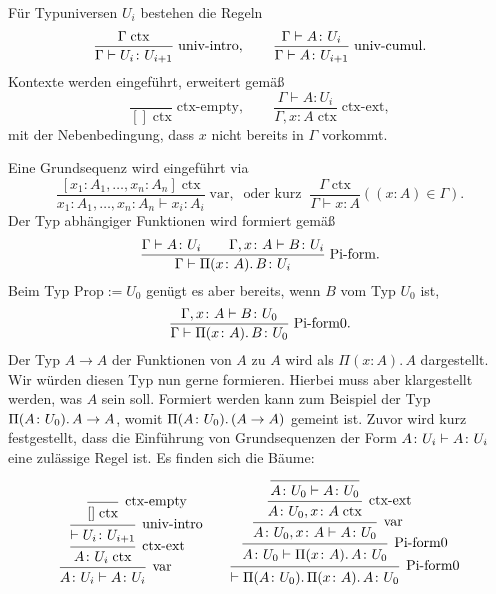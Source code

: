 Für Typuniversen $U_i$ bestehen die Regeln 
\[\dfrac{\Gamma\;\mathrm{ctx}}{\Gamma\vdash U_i\colon U_{i+1}}\;\text{univ-intro},
\qquad\dfrac{\Gamma\vdash A\colon U_i}{\Gamma\vdash A\colon U_{i+1}}\;\text{univ-cumul}.\]
Kontexte werden eingeführt, erweitert gemäß
\[\dfrac{}{[]\;\mathrm{ctx}}\;\text{ctx-empty},\qquad
\dfrac{\Gamma\vdash A\colon U_i}{\Gamma,x\colon A\;\mathrm{ctx}}\;\text{ctx-ext},\]
mit der Nebenbedingung, dass $x$ nicht bereits in $\Gamma$ vorkommt.

Eine Grundsequenz wird eingeführt via
\[\dfrac{[x_1\colon A_1, \ldots, x_n\colon A_n]\;\mathrm{ctx}}{
x_1\colon A_1, \ldots, x_n\colon A_n\vdash x_i\colon A_i}\;\mathrm{var},\;\;\text{oder kurz}\;\;
\dfrac{\Gamma\;\mathrm{ctx}}{\Gamma\vdash x\colon A}((x\colon A)\in\Gamma).\]
Der Typ abhängiger Funktionen wird formiert gemäß
\[\dfrac{\Gamma\vdash A\colon U_i\qquad\Gamma,x\colon A\vdash B\colon U_i}{
  \Gamma\vdash\Pi(x\colon A).\,B\colon U_i}\;\text{Pi-form}.\]
Beim Typ $\mathrm{Prop}:=U_0$ genügt es aber bereits, wenn $B$ vom Typ $U_0$ ist,
\[\dfrac{\Gamma,x\colon A\vdash B\colon U_0}{
  \Gamma\vdash\Pi(x\colon A).\,B\colon U_0}\;\text{Pi-form0}.\]
Der Typ $A\to A$ der Funktionen von $A$ zu $A$ wird als
$\Pi(x\colon A).\, A$ dargestellt. Wir würden diesen Typ nun gerne
formieren. Hierbei muss aber klargestellt werden, was $A$ sein soll.
Formiert werden kann zum Beispiel der Typ $\Pi(A\colon U_0).\,A\to A$,
womit $\Pi(A\colon U_0).\,(A\to A)$ gemeint ist.
Zuvor wird kurz festgestellt, dass die Einführung von Grundsequenzen der
Form $A\colon U_i\vdash A\colon U_i$ eine zulässige Regel ist.
Es finden sich die Bäume:
\[
\begin{array}{l@{\qquad}l}
\begin{prooftree}[center=false]
      \infer0[ctx-empty]{[]\;\mathrm{ctx}}
    \infer1[univ-intro]{\vdash\typeuniv_i\colon\typeuniv_{i+1}}
  \infer1[ctx-ext]{A\colon\typeuniv_i\;\mathrm{ctx}}
\infer1[var]{A\colon\typeuniv_i\vdash A\colon\typeuniv_i}
\end{prooftree}
&
\begin{prooftree}[center=false]
        \infer0{A\colon\typeuniv_0\vdash A\colon\typeuniv_0}
      \infer1[ctx-ext]{A\colon\typeuniv_0,x\colon A\;\mathrm{ctx}}
    \infer1[var]{A\colon\typeuniv_0,x\colon A\vdash A\colon\typeuniv_0}
  \infer1[Pi-form0]{A\colon\typeuniv_0\vdash\Pi(x\colon A).\, A\colon\typeuniv_0}
\infer1[Pi-form0]{\vdash\Pi(A\colon\typeuniv_0).\, \Pi(x\colon A).\, A\colon\typeuniv_0}
\end{prooftree}
\end{array}
\]

